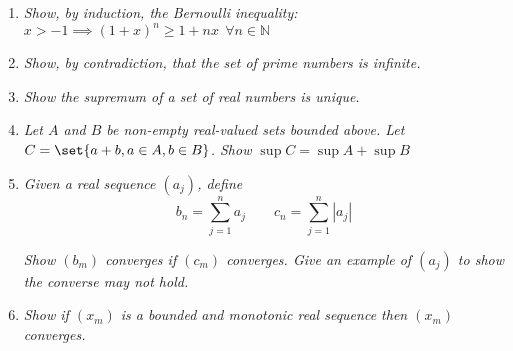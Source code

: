 \documentclass{article}
\begin{document}
\displayoptions

\section{}

\begin{enumerate}[1.]
  \item \textit{Show, by induction, the Bernoulli inequality: $x > -1 \implies (1 + x)^n \ge 1 + nx ~~ \forall n \in \mathbb{N}$}

  \item \textit{Show, by contradiction, that the set of prime numbers is infinite.}

  \item \textit{Show the supremum of a set of real numbers is unique.}

  \item \textit{Let $A$ and $B$ be non-empty real-valued sets bounded above. Let $C = \set{a +b, a \in A, b \in B}$. Show $\sup C = \sup A + \sup B$}

  \item \textit{Given a real sequence $(a_j)$, define}
    \[
        b_n = \sum^{n}_{j = 1} a_j
        \quad\quad
        c_n = \sum^{n}_{j = 1} |a_j|
    \]

    \textit{Show $(b_m)$ converges if $(c_m)$ converges. Give an example of $(a_j)$ to show the converse may not hold.}

  \item \textit{Show if $(x_m)$ is a bounded and monotonic real sequence then $(x_m)$ converges.}
\end{enumerate}

\end{document}
